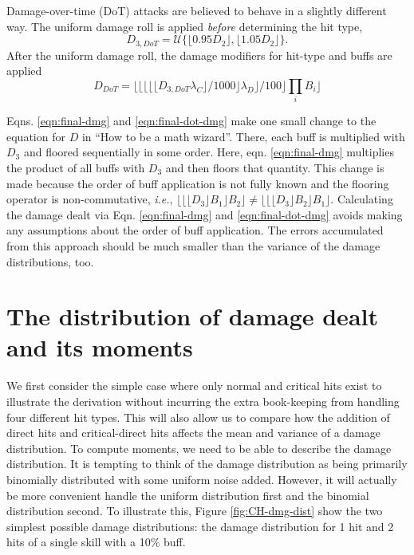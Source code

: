 \documentclass{article}
\begin{document}
    Damage-over-time (DoT) attacks are believed to behave in a slightly different way. The uniform damage roll is applied \textit{before} determining the hit type,
    \begin{equation}
        D_{3,DoT} = \mathcal{U}\{\lfloor 0.95 D_2 \rfloor, \lfloor 1.05 D_2 \rfloor \}.
    \end{equation}  
    After the uniform damage roll, the damage modifiers for hit-type and buffs are applied
    \begin{equation}\label{eqn:final-dot-dmg}
        D_{DoT} = \lfloor \lfloor \lfloor \lfloor \lfloor D_{3,DoT} \lambda_C \rfloor / 1000 \rfloor \lambda_D \rfloor / 100 \rfloor \prod_{i}B_i \rfloor
    \end{equation}
    
    Eqns. \ref{eqn:final-dmg} and \ref{eqn:final-dot-dmg} make one small change to the equation for $D$ in ``How to be a math wizard''. There, each buff is multiplied with $D_3$ and floored sequentially in some order. Here, eqn. \ref{eqn:final-dmg} multiplies the product of all buffs with $D_3$ and then floors that quantity. This change is made because the order of buff application is not fully known and the flooring operator is non-commutative, \textit{i.e.}, $\lfloor \lfloor \lfloor D_3 \rfloor B_1 \rfloor B_2 \rfloor \neq \lfloor \lfloor \lfloor D_3 \rfloor B_2 \rfloor B_1 \rfloor$. Calculating the damage dealt via Eqn. \ref{eqn:final-dmg} and \ref{eqn:final-dot-dmg} avoids making any assumptions about the order of buff application. The errors accumulated from this approach should be much smaller than the variance of the damage distributions, too.

    \section{The distribution of damage dealt and its moments}
    
        We first consider the simple case where only normal and critical hits exist to illustrate the derivation without incurring the extra book-keeping from handling four different hit types. This will also allow us to compare how the addition of direct hits and critical-direct hits affects the mean and variance of a damage distribution. To compute moments, we need to be able to describe the damage distribution. It is tempting to think of the damage distribution as being primarily binomially distributed with some uniform noise added. However, it will actually be more convenient handle the uniform distribution first and the binomial distribution second. To illustrate this, Figure \ref{fig:CH-dmg-dist} show the two simplest possible damage distributions: the damage distribution for 1 hit and 2 hits of a single skill with a 10\% buff.
\end{document}
